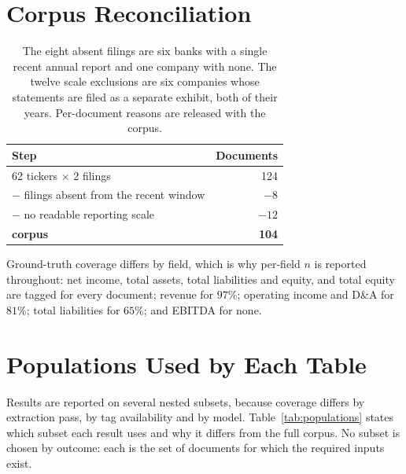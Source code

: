 \documentclass[11pt]{article}
\begin{document}
\section{Corpus Reconciliation}
\label{app:corpus}

\begin{table}[h]
\centering\small
\begin{tabular}{@{}lr@{}}
\toprule
\textbf{Step} & \textbf{Documents} \\
\midrule
62 tickers $\times$ 2 filings & 124 \\
$-$ filings absent from the recent window & $-8$ \\
$-$ no readable reporting scale & $-12$ \\
\midrule
\textbf{corpus} & \textbf{104} \\
\bottomrule
\end{tabular}
\caption{The eight absent filings are six banks with a single recent annual report and
one company with none. The twelve scale exclusions are six companies whose statements
are filed as a separate exhibit, both of their years. Per-document reasons are released
with the corpus.}
\label{tab:corpusrec}
\end{table}

Ground-truth coverage differs by field, which is why per-field $n$ is reported
throughout: net income, total assets, total liabilities and equity, and total equity
are tagged for every document; revenue for $97\%$; operating income and D\&A for
$81\%$; total liabilities for $65\%$; and EBITDA for none.

\section{Populations Used by Each Table}
\label{app:populations}

Results are reported on several nested subsets, because coverage differs by extraction
pass, by tag availability and by model. Table~\ref{tab:populations} states which subset
each result uses and why it differs from the full corpus. No subset is chosen by
outcome: each is the set of documents for which the required inputs exist.
\end{document}
